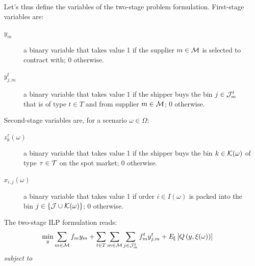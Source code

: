 \documentclass[a4paper,11pt]{article}
\begin{document}
	Let's thus define the variables of the two-stage problem formulation.
	First-stage variables are:
	\begin{description}
		\item [$y_m$] a binary variable that takes value 1 if the supplier $m \in {\cal M}$ is selected to contract with; 0 otherwise.
		\item [$y_{j,m}^{t}$] a binary variable that takes value 1 if the shipper buys the bin $ j \in {\cal J}^{t}_{m}$ that is of type $ t \in T$ and from supplier $m \in {\cal M}$; 0 otherwise.
	\end{description}
	Second-stage variables are, for a scenario $ \omega \in \Omega$:
	\begin{description}
		\item[$z_k^{\tau}(\omega)$] a binary variable that takes value 1 if the shipper buys the bin $ k \in {\cal K}(\omega)$ of type $ \tau \in {\cal T}$ on the spot market; 0 otherwise.
		\item[$ x_{i,j}(\omega)$] a binary variable that takes value 1 if order $ i \in I(\omega)$ is packed into the bin $ j \in \{{\cal J} \cup {\cal K}(\omega)\}$; 0 otherwise.
	\end{description}	
	The two-stage ILP formulation reads:
	\begin{equation}
		\label{2s:objf}
		\min_{y} \sum\limits_{m \in \cal M} {f_{m}}y_{m} +  \sum\limits_{t \in T} \sum\limits_{m \in {{\cal M}}} \sum\limits_{j \in {\cal J}_{m}^t} f_{m}^t y_{j,m}^t  + \emph{E}_{\xi}\left[Q \left(y,\xi(\omega)\right)\right] 
	\end{equation}
	\noindent \textit{subject to}
\end{document}
